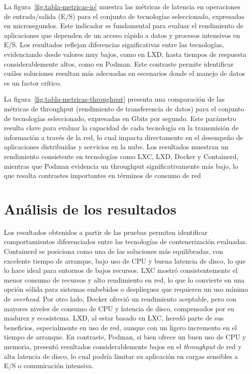 \noindent
La figura~\ref{fig:tabla-metricas-io} muestra las métricas de latencia en operaciones de entrada/salida (E/S) para el conjunto de tecnologías seleccionado, expresadas en microsegundos. Este indicador es fundamental para evaluar el rendimiento de aplicaciones que dependen de un acceso rápido a datos y procesos intensivos en E/S. Los resultados reflejan diferencias significativas entre las tecnologías, evidenciando desde valores muy bajos, como en LXD, hasta tiempos de respuesta considerablemente altos, como en Podman. Este contraste permite identificar cuáles soluciones resultan más adecuadas en escenarios donde el manejo de datos es un factor crítico.


\noindent
La figura~\ref{fig:tabla-metricas-throughput} presenta una comparación de las métricas de throughput (rendimiento de transferencia de datos) para el conjunto de tecnologías seleccionado, expresadas en Gbits por segundo. Este parámetro resulta clave para evaluar la capacidad de cada tecnología en la transmisión de información a través de la red, lo cual impacta directamente en el desempeño de aplicaciones distribuidas y servicios en la nube. Los resultados muestran un rendimiento consistente en tecnologías como LXC, LXD, Docker y Containerd, mientras que Podman evidencia un throughput significativamente más bajo, lo que resalta contrastes importantes en términos de consumo de red


\section{Análisis de los resultados}
\noindent
Los resultados obtenidos a partir de las pruebas permiten identificar comportamientos diferenciados entre las tecnologías de contenerización evaluadas. Containerd se posiciona como una de las soluciones más equilibradas, con excelente tiempo de arranque, bajo uso de CPU y buena latencia de disco, lo que lo hace ideal para entornos de bajos recursos.
LXC mostró consistentemente el menor consumo de recursos y alto rendimiento en red, lo que lo convierte en una opción sólida para sistemas embebidos o despliegues que requieren un uso mínimo de \textit{overhead}. 
Por otro lado, Docker ofreció un rendimiento aceptable, pero con mayores niveles de consumo de CPU y latencia de disco, compensados por su madurez y ecosistema. 
LXD, al estar basado en LXC, heredó parte de sus beneficios, especialmente en uso de red, aunque con un ligero incremento en el tiempo de arranque.
En contraste, Podman, si bien ofrece un buen uso de CPU y memoria, presentó resultados considerablemente bajos en el \textit{throughput} de red y alta latencia de disco, lo cual podría limitar su aplicación en cargas sensibles a E/S o comunicación intensiva.

